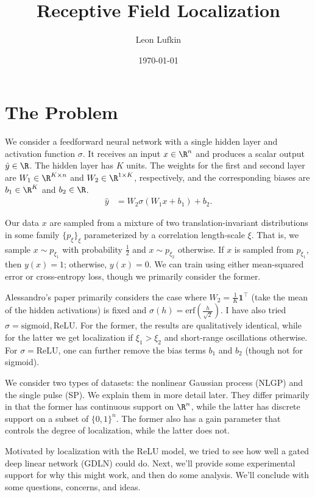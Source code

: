 \documentclass{article}
\title{Receptive Field Localization}
\author{Leon Lufkin}
\date{\today}
\begin{document}
\section{The Problem}
We consider a feedforward neural network with a single hidden layer and activation function $\sigma$.
It receives an input $x \in \R^n$ and produces a scalar output $\hat{y} \in \R$.
The hidden layer has $K$ units.
The weights for the first and second layer are $W_1 \in \R^{K \times n}$ and $W_2 \in \R^{1 \times K}$, respectively, and the corresponding biases are $b_1 \in \R^K$ and $b_2 \in \R$.
\begin{align}
  \hat{y} &= W_2 \sigma( W_1 x + b_1 ) + b_2. \label{eq:model}
\end{align}

Our data $x$ are sampled from a mixture of two translation-invariant distributions in some family $\{ p_\xi \}_{\xi}$ parameterized by a correlation length-scale $\xi$.
That is, we sample $x \sim p_{\xi_1}$ with probability $\frac{1}{2}$ and $x \sim p_{\xi_2}$ otherwise.
If $x$ is sampled from $p_{\xi_1}$, then $y(x) = 1$; otherwise, $y(x) = 0$. 
We can train using either mean-squared error or cross-entropy loss, though we primarily consider the former. 

Alessandro's paper primarily considers the case where $W_2 = \frac{1}{K} \mathbf{1}^\top$ (take the mean of the hidden activations) is fixed and $\sigma(h) = \text{erf}(\frac{h}{\sqrt{2}})$.
I have also tried $\sigma = \text{sigmoid}, \text{ReLU}$.
For the former, the results are qualitatively identical, while for the latter we get localization if $\xi_1 > \xi_2$ and short-range oscillations otherwise.
For $\sigma = \text{ReLU}$, one can further remove the bias terms $b_1$ and $b_2$ (though not for sigmoid).

We consider two types of datasets: the nonlinear Gaussian process (NLGP) and the single pulse (SP).
We explain them in more detail later.
They differ primarily in that the former has continuous support on $\R^n$, while the latter has discrete support on a subset of $\{ 0, 1 \}^n$.
The former also has a gain parameter that controls the degree of localization, while the latter does not. 

Motivated by localization with the ReLU model, we tried to see how well a gated deep linear network (GDLN) could do.
Next, we'll provide some experimental support for why this might work, and then do some analysis. 
We'll conclude with some questions, concerns, and ideas.
\end{document}
